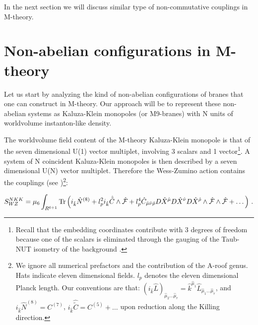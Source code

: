 \documentclass[12pt,a4paper]{article}
\begin{document}
In the next section we will discuss similar type of non-commutative
couplings in M-theory.


\section{Non-abelian configurations in M-theory}

Let us start by analyzing the kind of non-abelian configurations of
branes that one can construct in M-theory. Our approach will be to
represent these non-abelian systems as Kaluza-Klein monopoles
(or M9-branes) with N units of worldvolume instanton-like density.

The worldvolume field content of the M-theory Kaluza-Klein
monopole is that
of the seven dimensional U(1) vector multiplet, involving 3 scalars
and 1 vector\footnote{Recall that the embedding coordinates contribute
with 3 degrees of freedom because one of the scalars is eliminated 
through the gauging of the Taub-NUT isometry of the background 
\cite{BJO}.}.
A system of N coincident
Kaluza-Klein monopoles is then described by a seven dimensional
U(N) vector multiplet.
Therefore the Wess-Zumino action contains the couplings 
(see \cite{BEL})\footnote{We
ignore all numerical prefactors and the contribution of the A-roof genus.
Hats indicate eleven dimensional fields. $l_p$ denotes the eleven
dimensional Planck length. Our conventions are that:
$(i_{\hat k}{\hat L})_{{\hat \mu}_2\dots{\hat \mu}_r}=
{\hat k}^{{\hat \mu}_1} {\hat L}_{{\hat \mu}_1\dots{\hat \mu}_r}$,
and $i_{\hat k}{\hat N}^{(8)}=C^{(7)}$, $i_{\hat k}{\hat {\tilde C}}=
C^{(5)}+\dots$ upon reduction along the Killing direction.}:

\begin{equation}
\label{Mmono}
S^{N KK}_{WZ}=\mu_6\int_{R^{6+1}}{\rm Tr}\left( i_{\hat k}{\hat N}^{(8)}
+l_p^2 i_{\hat k}{\hat {\tilde C}}\wedge {\hat {\cal F}}+l_p^4
{\hat C}_{{\hat \mu}{\hat \nu}{\hat \rho}}D{\hat X}^{\hat \mu}
D{\hat X}^{\hat \nu}D{\hat X}^{\hat \rho}\wedge {\hat {\cal F}}\wedge
{\hat {\cal F}}+\dots\right)\, .
\end{equation}
\end{document}

